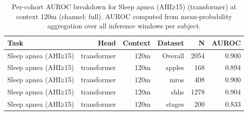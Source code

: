 \begin{table}[ht]
\centering
\caption{Per-cohort AUROC breakdown for Sleep apnea (AHI≥15) (transformer) at context 120m (channel: full). AUROC computed from mean-probability aggregation over all inference windows per subject.}
\label{tab:cohort_apnea_binary_transformer_full}
\begin{tabular}{lrrrrr}
\toprule
Task & Head & Context & Dataset & N & AUROC \\
\midrule
Sleep apnea (AHI≥15) & transformer & 120m & Overall & 2054 & 0.900 \\
Sleep apnea (AHI≥15) & transformer & 120m & apples & 168 & 0.894 \\
Sleep apnea (AHI≥15) & transformer & 120m & mros & 408 & 0.900 \\
Sleep apnea (AHI≥15) & transformer & 120m & shhs & 1278 & 0.904 \\
Sleep apnea (AHI≥15) & transformer & 120m & stages & 200 & 0.833 \\
\bottomrule
\end{tabular}
\end{table}